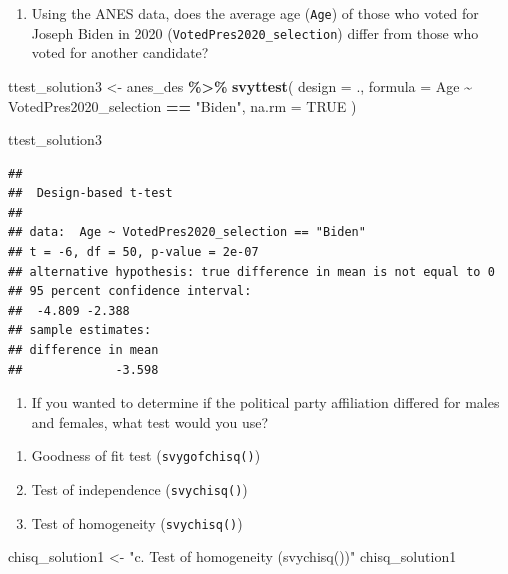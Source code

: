 \documentclass[
]{krantz}
\makeatletter
\newenvironment{Shaded}{\begin{snugshade}}{\end{snugshade}}
\newcommand{\AttributeTok}[1]{\textcolor[rgb]{0.27,0.27,0.27}{#1}}
\newcommand{\ConstantTok}[1]{\textcolor[rgb]{0.37,0.37,0.37}{#1}}
\newcommand{\FunctionTok}[1]{\textcolor[rgb]{0.27,0.27,0.27}{\textbf{#1}}}
\newcommand{\NormalTok}[1]{#1}
\newcommand{\OtherTok}[1]{\textcolor[rgb]{0.37,0.37,0.37}{#1}}
\newcommand{\SpecialCharTok}[1]{\textcolor[rgb]{0.43,0.43,0.43}{\textbf{#1}}}
\newcommand{\StringTok}[1]{\textcolor[rgb]{0.5,0.5,0.5}{#1}}
\providecommand{\tightlist}{%
  \setlength{\itemsep}{0pt}\setlength{\parskip}{0pt}}
\newenvironment{kframe}{%
\medskip{}
\setlength{\fboxsep}{.8em}
 \def\at@end@of@kframe{}%
 \ifinner\ifhmode%
  \def\at@end@of@kframe{\end{minipage}}%
  \begin{minipage}{\columnwidth}%
 \fi\fi%
 \def\FrameCommand##1{\hskip\@totalleftmargin \hskip-\fboxsep
 \colorbox{shadecolor}{##1}\hskip-\fboxsep
     \hskip-\linewidth \hskip-\@totalleftmargin \hskip\columnwidth}%
 \MakeFramed {\advance\hsize-\width
   \@totalleftmargin\z@ \linewidth\hsize
   \@setminipage}}%
 {\par\unskip\endMakeFramed%
 \at@end@of@kframe}
\renewenvironment{Shaded}{\begin{kframe}}{\end{kframe}}
\makeatother
\begin{document}
\begin{enumerate}
\def\labelenumi{\arabic{enumi}.}
\setcounter{enumi}{2}
\tightlist
\item
  Using the ANES data, does the average age (\texttt{Age}) of those who voted for Joseph Biden in 2020 (\texttt{VotedPres2020\_selection}) differ from those who voted for another candidate?
\end{enumerate}

\begin{Shaded}
\begin{Highlighting}[]
\NormalTok{ttest\_solution3 }\OtherTok{\textless{}{-}}\NormalTok{ anes\_des }\SpecialCharTok{\%\textgreater{}\%}
  \FunctionTok{svyttest}\NormalTok{(}
    \AttributeTok{design =}\NormalTok{ .,}
    \AttributeTok{formula =}\NormalTok{ Age }\SpecialCharTok{\textasciitilde{}}\NormalTok{ VotedPres2020\_selection }\SpecialCharTok{==} \StringTok{"Biden"}\NormalTok{,}
    \AttributeTok{na.rm =} \ConstantTok{TRUE}
\NormalTok{  )}

\NormalTok{ttest\_solution3}
\end{Highlighting}
\end{Shaded}

\begin{verbatim}
## 
##  Design-based t-test
## 
## data:  Age ~ VotedPres2020_selection == "Biden"
## t = -6, df = 50, p-value = 2e-07
## alternative hypothesis: true difference in mean is not equal to 0
## 95 percent confidence interval:
##  -4.809 -2.388
## sample estimates:
## difference in mean 
##             -3.598
\end{verbatim}

\begin{enumerate}
\def\labelenumi{\arabic{enumi}.}
\setcounter{enumi}{3}
\tightlist
\item
  If you wanted to determine if the political party affiliation differed for males and females, what test would you use?
\end{enumerate}

\begin{enumerate}
\def\labelenumi{\alph{enumi}.}
\tightlist
\item
  Goodness of fit test (\texttt{svygofchisq()})
\item
  Test of independence (\texttt{svychisq()})
\item
  Test of homogeneity (\texttt{svychisq()})
\end{enumerate}

\begin{Shaded}
\begin{Highlighting}[]
\NormalTok{chisq\_solution1 }\OtherTok{\textless{}{-}} \StringTok{"c. Test of homogeneity (\textasciigrave{}svychisq()\textasciigrave{})"}
\NormalTok{chisq\_solution1}
\end{Highlighting}
\end{Shaded}
\end{document}
